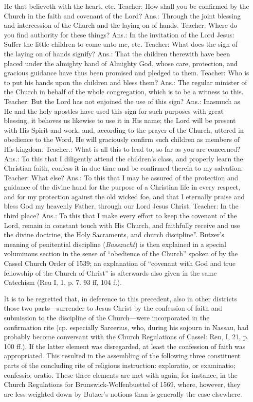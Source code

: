 He that believeth with the heart, etc. Teacher: How shall you be confirmed by the Church in the faith and covenant of the Lord? Ans.: Through the joint blessing and intercession of the Church and the laying on of hands. Teacher: Where do you find authority for these things? Ans.: In the invitation of the Lord Jesus: Suffer the little children to come unto me, etc. Teacher: What does the sign of the laying on of hands signify? Ans.: That the children therewith have been placed under the almighty hand of Almighty God, whose care, protection, and gracious guidance have thus been promised and pledged to them. Teacher: Who is to put his hands upon the children and bless them? Ans.: The regular minister of the Church in behalf of the whole congregation, which is to be a witness to this. Teacher: But the Lord has not enjoined the use of this sign? Ans.: Inasmuch as He and the holy apostles have used this sign for such purposes with great blessing, it behoves us likewise to use it in His name; the Lord will be present with His Spirit and work, and, according to the prayer of the Church, uttered in obedience to the Word, He will graciously confirm such children as members of His kingdom. Teacher.: What is all this to lead to, so far as you are concerned? Ans.: To this that I diligently attend the children's class, and properly learn the Christian faith, confess it in due time and be confirmed therein to my salvation. Teacher: What else? Ans.: To this that I may be assured of the protection and guidance of the divine hand for the purpose of a Christian life in every respect, and for my protection against the old wicked foe, and that I eternally praise and bless God my heavenly Father, through our Lord Jesus Christ. Teacher: In the third place? Ans.: To this that I make every effort to keep the covenant of the Lord, remain in constant touch with His Church, and faithfully receive and use the divine doctrine, the Holy Sacraments, and church discipline”. Butzer’s meaning of penitential discipline (\emph{Busszucht}) is then explained in a special voluminous section in the sense of “obedience of the Church” spoken of by the Cassel Church Order of 1539; an explanation of “covenant with God and true fellowship of the Church of Christ” is afterwards also given in the same Catechism (Reu I, 1, p. 7. 93 ff, 104 f.).

It is to be regretted that, in deference to this precedent, also in other districts those two parts—surrender to Jesus Christ by the confession of faith and submission to the discipline of the Church—were incorporated in the confirmation
rite (cp. especially Sarcerius, who, during his sojourn in Nassau, had probably become conversant with the Church Regulations of Cassel: Reu, I, 21, p. 100 ff.). If the latter element was disregarded, at least the confession of faith was appropriated. This resulted in the assembling of the following three constituent parts of the concluding rite of religious instruction: exploratio, or examinatio; confessio; oratio. These three elements are met with again, for instance, in the Church Regulations for Brunswick-Wolfenbuettel of 1569, where, however, they are less weighted down by Butzer’s notions than is generally the case elsewhere.

